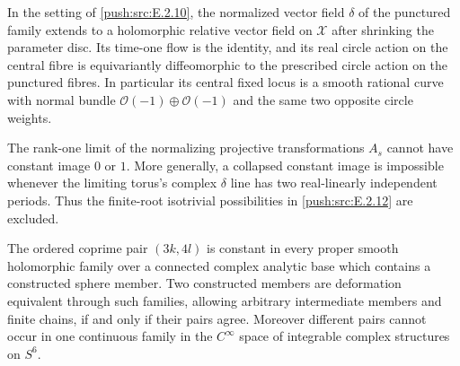 \begin{proposition}\hypertarget{tag-032Z}{}\label{push:src:E.2.14}


In the setting of \ref{push:src:E.2.10}, the normalized vector field
$\delta$ of the punctured family extends to a holomorphic
relative vector field on $\mathcal X$ after shrinking
the parameter disc.  Its time-one flow is the identity,
and its real circle action on the central fibre is
equivariantly diffeomorphic to the prescribed circle
action on the punctured fibres.  In particular its
central fixed locus is a smooth rational curve with
normal bundle $\mathcal O(-1)\oplus\mathcal O(-1)$
and the same two opposite circle weights.

The rank-one limit of the normalizing projective
transformations $A_s$ cannot have constant image
$0$ or $1$.  More generally, a collapsed constant
image is impossible whenever the limiting torus's
complex $\delta$ line has two real-linearly
independent periods.  Thus the finite-root
isotrivial possibilities in \ref{push:src:E.2.12} are excluded.
\end{proposition}

\begin{corollary}\hypertarget{tag-033C}{}\label{push:src:E.2.4}


The ordered coprime pair $(3k,4l)$ is constant in every
proper smooth holomorphic family over a connected complex
analytic base which contains a constructed sphere member.
Two constructed members are deformation equivalent through
such families, allowing arbitrary intermediate members and
finite chains, if and only if their pairs agree.
Moreover different pairs cannot occur in one continuous
family in the $C^\infty$ space of integrable complex
structures on $S^6$.
\end{corollary}

